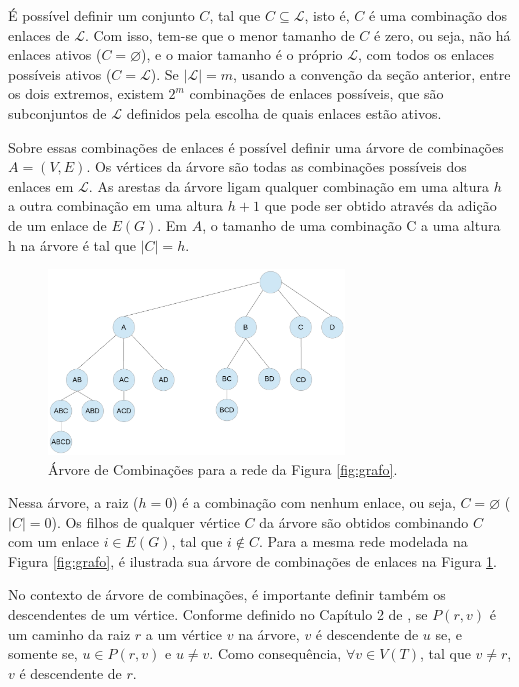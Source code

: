 É possível definir um conjunto $C$, tal que $C \subseteq \mathcal{L}$, isto é, $C$ é uma combinação dos enlaces de $\mathcal{L}$. Com isso, tem-se que o menor tamanho de $C$ é zero, ou seja, não há enlaces ativos ($C=\varnothing$), e o maior tamanho é o próprio $\mathcal{L}$, com todos os enlaces possíveis ativos ($C=\mathcal{L}$). Se $|\mathcal{L}|=m$, usando a convenção da seção anterior, entre os dois extremos, existem $2^m$ combinações de enlaces possíveis, que são subconjuntos de $\mathcal{L}$ definidos pela escolha de quais enlaces estão ativos.

Sobre essas combinações de enlaces é possível definir uma árvore de combinações $A=(V,E)$. Os vértices da árvore são todas as combinações possíveis dos enlaces em $\mathcal{L}$. As arestas da árvore ligam qualquer combinação em uma altura $h$ a outra combinação em uma altura $h+1$ que pode ser obtido através da adição de um enlace de $E(G)$. Em $A$, o tamanho de uma combinação C a uma altura h na árvore é tal que $|C|=h$.

\begin{figure}[htb]
\centering
\includegraphics[width=0.7\textwidth]{figs/arvore}
\caption[Árvore de Combinações para a rede da Figura \ref{fig:grafo}.]
{Árvore de Combinações para a rede da Figura \ref{fig:grafo}.}
\label{fig:arvore}
\end{figure}

Nessa árvore, a raiz ($h=0$) é a combinação com nenhum enlace, ou seja, $C=\varnothing$ ($|C|=0$). Os filhos de qualquer vértice $C$ da árvore são obtidos combinando $C$ com um enlace $i \in E(G)$, tal que $i \notin C$. Para a mesma rede modelada na Figura \ref{fig:grafo}, é ilustrada sua árvore de combinações de enlaces na Figura \ref{fig:arvore}.

No contexto de árvore de combinações, é importante definir também os descendentes de um vértice. Conforme definido no Capítulo 2 de \cite{grafos}, se $P(r,v)$ é um caminho da raiz $r$ a um vértice $v$ na árvore, $v$ é descendente de $u$ se, e somente se, $u \in P(r,v)$ e $u \neq v$. Como consequência, $\forall v \in V(T)$, tal que $v \neq r$, $v$ é descendente de $r$. 

